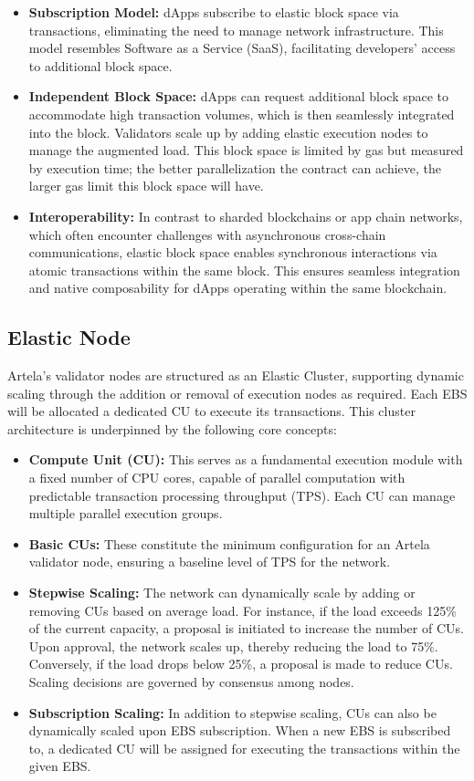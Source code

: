 \begin{itemize}
\item \textbf{Subscription Model:} dApps subscribe to elastic block space via transactions, eliminating the need to manage network infrastructure. This model resembles Software as a Service (SaaS), facilitating developers' access to additional block space.
\item \textbf{Independent Block Space:} dApps can request additional block space to accommodate high transaction volumes, which is then seamlessly integrated into the block. Validators scale up by adding elastic execution nodes to manage the augmented load. This block space is limited by gas but measured by execution time; the better parallelization the contract can achieve, the larger gas limit this block space will have.
\item \textbf{Interoperability:} In contrast to sharded blockchains or app chain networks, which often encounter challenges with asynchronous cross-chain communications, elastic block space enables synchronous interactions via atomic transactions within the same block. This ensures seamless integration and native composability for dApps operating within the same blockchain.
\end{itemize}

\subsection{Elastic Node}

Artela's validator nodes are structured as an Elastic Cluster, supporting dynamic scaling through the addition or removal of execution nodes as required. Each EBS will be allocated a dedicated CU to execute its transactions. This cluster architecture is underpinned by the following core concepts:

\begin{itemize}
\item \textbf{Compute Unit (CU):} This serves as a fundamental execution module with a fixed number of CPU cores, capable of parallel computation with predictable transaction processing throughput (TPS). Each CU can manage multiple parallel execution groups.
\item \textbf{Basic CUs:} These constitute the minimum configuration for an Artela validator node, ensuring a baseline level of TPS for the network.
\item \textbf{Stepwise Scaling:} The network can dynamically scale by adding or removing CUs based on average load. For instance, if the load exceeds 125\% of the current capacity, a proposal is initiated to increase the number of CUs. Upon approval, the network scales up, thereby reducing the load to 75\%. Conversely, if the load drops below 25\%, a proposal is made to reduce CUs. Scaling decisions are governed by consensus among nodes.
\item \textbf{Subscription Scaling:} In addition to stepwise scaling, CUs can also be dynamically scaled upon EBS subscription. When a new EBS is subscribed to, a dedicated CU will be assigned for executing the transactions within the given EBS.
\end{itemize}

